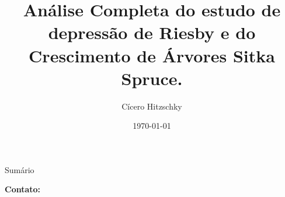 \documentclass{libs/ufc_format}
\title[Aprendizado Estatístico em Dados Longitudinais]{\huge\textbf{Análise Completa do estudo de depressão de Riesby e do Crescimento de Árvores Sitka Spruce.}}
\subtitle{}
\author{Cícero Hitzschky}
\institute[UFC]{
    \normalsize{\email{cicero.hitzschky@alu.ufc.br}}
    \newline
    \department{Departamento de Estatística e Matemática Aplicada}
    \newline
    \ufc
}
\date{\today}
\begin{document}


\begin{frame}{}
    \maketitle
\end{frame}

\begin{frame}{Sumário}
    \begin{multicols}{2}
        \tableofcontents
    \end{multicols}
\end{frame}








%    




\begin{frame}{}
    \centering
    \huge{\textbf{}}
    
    \vspace{1cm}
    
    \Large{\textbf{Contato:}}
    \newline
    \vspace*{0.5cm}
    \large{}
\end{frame}
\end{document}
